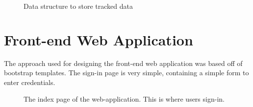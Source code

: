 \vspace*{\fill}

\begin{figure}[H]
  \centering
  \caption[Tracked data structure]{Data structure to store tracked data}
  \label{fig:tracked-data-uml-class}
\end{figure}

\vspace*{\fill}

\newpage

\section{Front-end Web Application}
The approach used for designing the front-end web application was based off of bootstrap templates. The sign-in page is very simple, containing a simple form to enter credentials.

\begin{figure}[H]
  \centering
  \caption[Web Sign-in Page]{The index page of the web-application. This is where users sign-in.}
  \label{fig:web-sign-in-page}
\end{figure}

